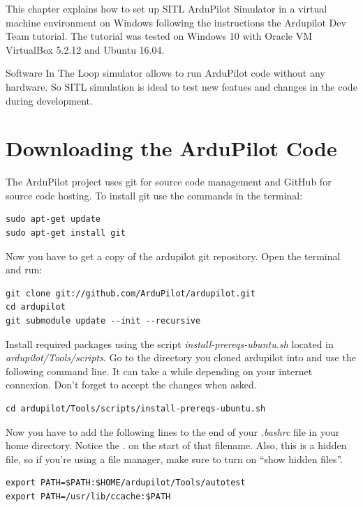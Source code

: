 This chapter explains how to set up SITL ArduPilot Simulator in a virtual machine environment on Windows following the instructions the Ardupilot Dev Team tutorial. The tutorial was tested on Windows 10 with Oracle VM VirtualBox 5.2.12 and Ubuntu 16.04.

Software In The Loop simulator allows to run ArduPilot code without any hardware. So SITL simulation is ideal to test new featues and changes in the code during development.

\section{Downloading the ArduPilot Code} \label{downloading_the_code}
The ArduPilot project uses git for source code management and GitHub for source code hosting. To install git use the commands in the terminal:  %

\begin{verbatim}
sudo apt-get update
sudo apt-get install git
\end{verbatim}

Now you have to get a copy of the ardupilot git repository. Open the terminal and run:
\begin{verbatim}
git clone git://github.com/ArduPilot/ardupilot.git
cd ardupilot
git submodule update --init --recursive
\end{verbatim}

Install required packages using the script \textit{install-prereqs-ubuntu.sh}  located in \textit{ardupilot/Tools/scripts}. Go to the directory you cloned ardupilot into and use the following command line. It can take a while depending on your internet connexion. Don't forget to accept the changes when asked.
\begin{verbatim}
cd ardupilot/Tools/scripts/install-prereqs-ubuntu.sh
\end{verbatim}

Now you have to add the following lines to the end of your \textit{.bashrc} file in your home directory. Notice the . on the start of that filename. Also, this is a hidden file, so if you’re using a file manager, make sure to turn on “show hidden files”.

\begin{verbatim} 
export PATH=$PATH:$HOME/ardupilot/Tools/autotest
export PATH=/usr/lib/ccache:$PATH
\end{verbatim}


